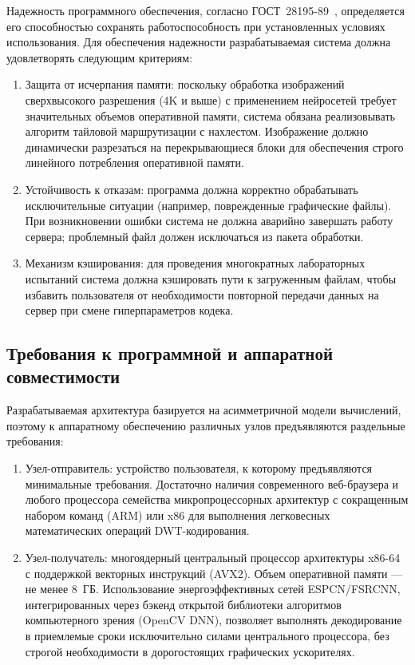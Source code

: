 Надежность программного обеспечения, согласно ГОСТ~28195-89~\cite{gost_28195_89}, определяется его способностью сохранять работоспособность при установленных условиях использования. Для обеспечения надежности разрабатываемая система должна удовлетворять следующим критериям:
\begin{enumerate}
    \item Защита от исчерпания памяти: поскольку обработка изображений сверхвысокого разрешения (4K и выше) с применением нейросетей требует значительных объемов оперативной памяти, система обязана реализовывать алгоритм тайловой маршрутизации с нахлестом. Изображение должно динамически разрезаться на перекрывающиеся блоки для обеспечения строго линейного потребления оперативной памяти.
    \item Устойчивость к отказам: программа должна корректно обрабатывать исключительные ситуации (например, поврежденные графические файлы). При возникновении ошибки система не должна аварийно завершать работу сервера; проблемный файл должен исключаться из пакета обработки.
    \item Механизм кэширования: для проведения многократных лабораторных испытаний система должна кэшировать пути к загруженным файлам, чтобы избавить пользователя от необходимости повторной передачи данных на сервер при смене гиперпараметров кодека.
\end{enumerate}

\subsection{Требования к программной и аппаратной совместимости}

Разрабатываемая архитектура базируется на асимметричной модели вычислений, поэтому к аппаратному обеспечению различных узлов предъявляются раздельные требования:
\begin{enumerate}
    \item Узел-отправитель: устройство пользователя, к которому предъявляются минимальные требования. Достаточно наличия современного веб-браузера и любого процессора семейства микропроцессорных архитектур с сокращенным набором команд (ARM) или x86 для выполнения легковесных математических операций DWT-кодирования.
    \item Узел-получатель: многоядерный центральный процессор архитектуры x86-64 с поддержкой векторных инструкций (AVX2). Объем оперативной памяти — не менее 8~ГБ. Использование энергоэффективных сетей ESPCN/FSRCNN, интегрированных через бэкенд открытой библиотеки алгоритмов компьютерного зрения (OpenCV DNN), позволяет выполнять декодирование в приемлемые сроки исключительно силами центрального процессора, без строгой необходимости в дорогостоящих графических ускорителях.
\end{enumerate}

